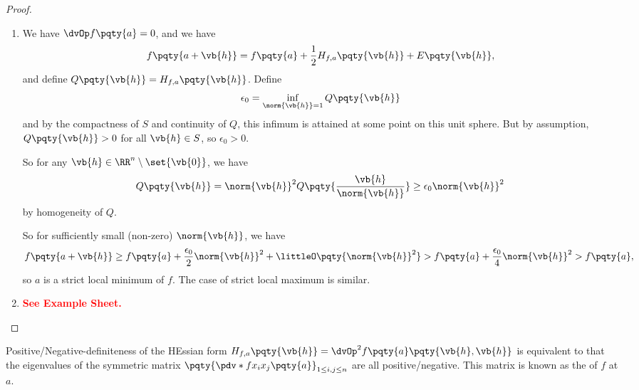 \begin{proof}
\begin{enumerate}[label=(\alph*)]
        Note that we have
        \[
            \frac{\abs{E\pqty{\vb{h}}}}{\norm{\vb{h}}^2} \leq \sum_{i, j = 1}^{n} \int_{0}^{1} \pqty{1 - t} \abs{\dvOp_{ij} f\pqty{a + t \vb{h}} - \dvOp_{ij} f\pqty{a}} \dd{t},
        \]    
        and given \(\epsilon > 0\), there is \(\delta > 0\) such that
        \[
            \vb{h} \in \oball{\vb{0}}{\delta} \implies \abs{\dvOp_{ij} f\pqty{a + t \vb{h}} - \dvOp_{ij} f\pqty{a}} < \epsilon
        \]
        for all \(t \in \ccintv{0}{1}, 1 \leq i, j \leq n\), since \(\dvOp_{ij} f\) is continuous at \(a\). Hence, integrating this over \(\ccintv{0}{1}\), we have
        \[
            \abs{\dvOp_{ij} \pqty{a + t \vb{h}} - \dvOp_{ij} f\pqty{a}} < \frac{\epsilon}{n^2},
        \]
        and such \(\delta\) is possible to choose since there are only finitely many pairs \(\pqty{i, j}\), and hence summing gives
        \[
            \vb{h} \in \oball{\vb{0}}{\delta} \implies \frac{\abs{E\pqty{\vb{h}}}}{\norm{\vb{h}}^2} < \frac{\epsilon}{2},
        \]
        showing that \(E\pqty{\vb{h}} = \littleO\pqty{\norm{\vb{h}}^2}\) as \(\vb{h} \to \vb{0}\).

        \item We have \(\dvOp f\pqty{a} = 0\), and we have
        \[
            f\pqty{a + \vb{h}} = f\pqty{a} + \frac{1}{2} H_{f, a}\pqty{\vb{h}} + E\pqty{\vb{h}},
        \]
        and define \(Q\pqty{\vb{h}} = H_{f, a}\pqty{\vb{h}}\). Define
        \[
            \epsilon_0 = \inf_{\norm{\vb{h}} = 1} Q\pqty{\vb{h}}
        \]
        and by the compactness of \(S\) and continuity of \(Q\), this infimum is attained at some point on this unit sphere. But by assumption, \(Q\pqty{\vb{h}} > 0\) for all \(\vb{h} \in S\), so \(\epsilon_0 > 0\).

        So for any \(\vb{h} \in \RR^n \setminus \set{\vb{0}}\), we have
        \[
            Q\pqty{\vb{h}} = \norm{\vb{h}}^2 Q\pqty{\frac{\vb{h}}{\norm{\vb{h}}}} \geq \epsilon_0 \norm{\vb{h}}^2
        \]
        by homogeneity of \(Q\).

        So for sufficiently small (non-zero) \(\norm{\vb{h}}\), we have
        \[
            f\pqty{a + \vb{h}} \geq f\pqty{a} + \frac{\epsilon_0}{2} \norm{\vb{h}}^2 + \littleO\pqty{\norm{\vb{h}}^2} > f\pqty{a} + \frac{\epsilon_0}{4} \norm{\vb{h}}^2 > f\pqty{a},
        \]
        so \(a\) is a strict local minimum of \(f\). The case of strict local maximum is similar.

        \item \textbf{\textcolor{red}{See Example Sheet.}}
    \end{enumerate}
\end{proof}

\begin{remark}
    Positive/Negative-definiteness of the HEssian form \(H_{f, a} \pqty{\vb{h}} = \dvOp^2 f\pqty{a}\pqty{\vb{h}, \vb{h}}\) is equivalent to that the eigenvalues of the symmetric matrix \(\pqty{\pdv*{f}{x_i}{x_j}\pqty{a}}_{1 \leq i, j \leq n}\) are all positive/negative. This matrix is known as the  of \(f\) at \(a\).
\end{remark}
